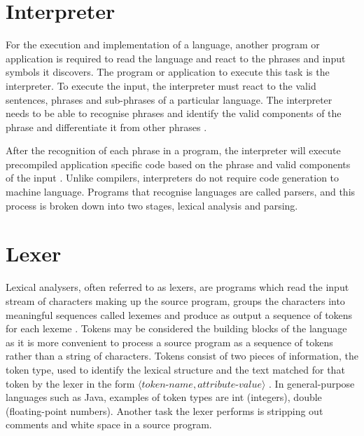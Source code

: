 \section{Interpreter}

For the execution and implementation of a language, another program or application is required to read the language and react to the phrases and input symbols it discovers. The program or application to execute this task is the interpreter. To execute the input, the interpreter must react to the valid sentences, phrases and sub-phrases of a particular language. The interpreter needs to be able to recognise phrases and identify the valid components of the phrase and differentiate it from other phrases \cite{parr2013definitive}. \newline \par

After the recognition of each phrase in a program, the interpreter will execute precompiled application specific code based on the phrase and valid components of the input \cite{hudak1997domain}. Unlike compilers, interpreters do not require code generation to machine language. Programs that recognise languages are called parsers, and this process is broken down into two stages, lexical analysis and parsing.

\section{Lexer}

Lexical analysers, often referred to as lexers, are programs which read the input stream of characters making up the source program, groups the characters into meaningful sequences called lexemes and produce as output a sequence of tokens for each lexeme \cite{aho2003compilers}. Tokens may be considered the building blocks of the language as it is more convenient to process a source program as a sequence of tokens rather than a string of characters. Tokens consist of two pieces of information, the token type, used to identify the lexical structure and the text matched for that token by the lexer in the form $\langle \textit{token-name}, \textit{attribute-value} \rangle$ \cite{aho2003compilers}. In general-purpose languages such as Java, examples of token types are int (integers), double (floating-point numbers). Another task the lexer performs is stripping out comments and white space in a source program.\newline \par

